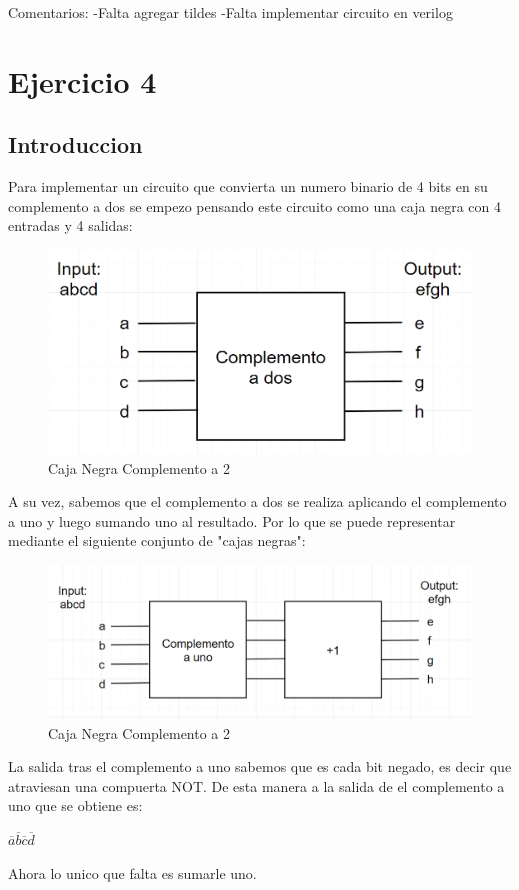 \documentclass{article}
\begin{document}
	Comentarios:
	\newline -Falta agregar tildes
	\newline -Falta implementar circuito en verilog
	\section{Ejercicio 4}
	\subsection{Introduccion}
		\hspace{10mm} Para implementar un circuito que convierta un numero binario de 4 bits en su complemento a dos se empezo pensando este circuito como una caja negra con 4 entradas y 4 salidas:
		\begin{figure}[h!]
			\includegraphics[width=\linewidth,scale=0.5]{comp2.png}
  			\caption{Caja Negra Complemento a 2}
		\end{figure}
		\newline \hspace{10mm} A su vez, sabemos que el complemento a dos se realiza aplicando el complemento a uno y luego sumando uno al resultado. Por lo que se puede representar mediante el siguiente conjunto de "cajas negras":
		\begin{figure}[h!]
			\includegraphics[width=\linewidth,scale=0.5]{comp1+1.png}
  			\caption{Caja Negra Complemento a 2}
		\end{figure}
		\newline \hspace{10mm} La salida tras el complemento a uno sabemos que es cada bit negado, es decir que atraviesan una compuerta NOT. De esta manera a la salida de el complemento a uno que se obtiene es: 
		\newline \centerline{$\overline{a} \overline{b} \overline{c} \overline{d}$} 
		\hspace{10mm} Ahora lo unico que falta es sumarle uno.
\end{document}
